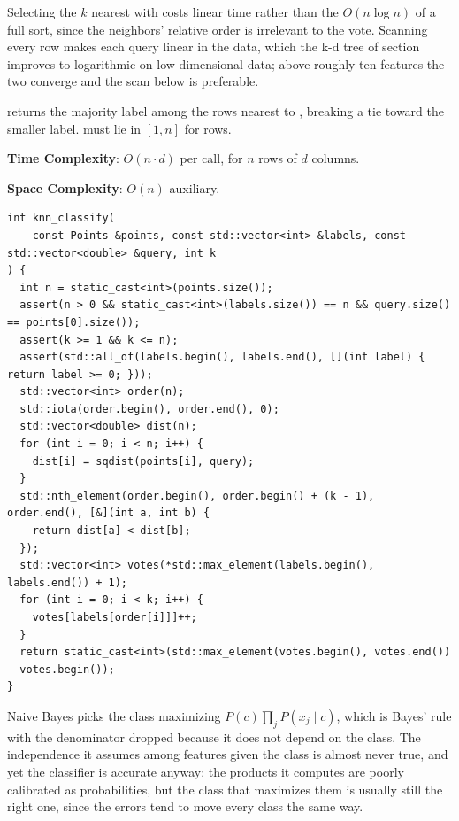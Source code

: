 Selecting the $k$ nearest with  costs linear time rather than the $O(n \log n)$ of a full sort, since the neighbors' relative order is irrelevant to the vote. Scanning every row makes each query linear in the data, which the k-d tree of section  improves to logarithmic on low-dimensional data; above roughly ten features the two converge and the scan below is preferable.

\begin{compactitem}
  \item {} returns the majority label among the  rows nearest to , breaking a tie toward the smaller label.  must lie in $[1, n]$ for  rows.
\end{compactitem}

\textbf{Time Complexity}: $O(n \cdot d)$ per call, for $n$ rows of $d$ columns.

\textbf{Space Complexity}: $O(n)$ auxiliary.

\begin{lstlisting}[style=cpp]
int knn_classify(
    const Points &points, const std::vector<int> &labels, const std::vector<double> &query, int k
) {
  int n = static_cast<int>(points.size());
  assert(n > 0 && static_cast<int>(labels.size()) == n && query.size() == points[0].size());
  assert(k >= 1 && k <= n);
  assert(std::all_of(labels.begin(), labels.end(), [](int label) { return label >= 0; }));
  std::vector<int> order(n);
  std::iota(order.begin(), order.end(), 0);
  std::vector<double> dist(n);
  for (int i = 0; i < n; i++) {
    dist[i] = sqdist(points[i], query);
  }
  std::nth_element(order.begin(), order.begin() + (k - 1), order.end(), [&](int a, int b) {
    return dist[a] < dist[b];
  });
  std::vector<int> votes(*std::max_element(labels.begin(), labels.end()) + 1);
  for (int i = 0; i < k; i++) {
    votes[labels[order[i]]]++;
  }
  return static_cast<int>(std::max_element(votes.begin(), votes.end()) - votes.begin());
}
\end{lstlisting}
Naive Bayes picks the class maximizing $P(c) \prod_j P(x_j \mid c)$, which is Bayes' rule with the denominator dropped because it does not depend on the class. The independence it assumes among features given the class is almost never true, and yet the classifier is accurate anyway: the products it computes are poorly calibrated as probabilities, but the class that maximizes them is usually still the right one, since the errors tend to move every class the same way.


